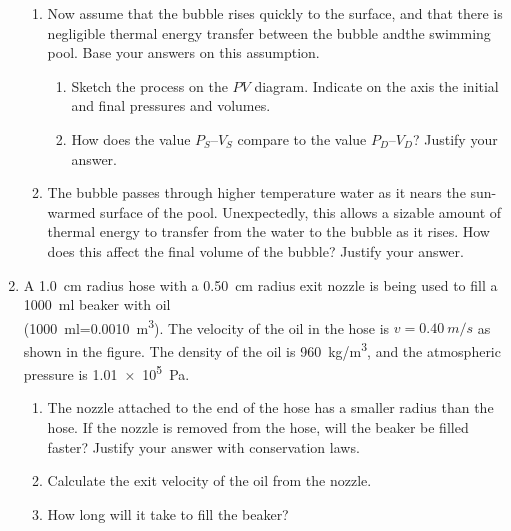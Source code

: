 \documentclass{../../../oss-apphys}
\begin{document}
\begin{enumerate}[leftmargin=15pt]
\begin{enumerate}[leftmargin=18pt]
  \item Now assume that the bubble rises quickly to the surface, and that
    there is negligible thermal energy transfer between the bubble andthe
    swimming pool. Base your answers on this assumption.
    \begin{enumerate}
    \item Sketch the process on the $PV$ diagram. Indicate on the axis the
      initial and final pressures and volumes.
    \item How does the value $P_S$--$V_S$ compare to the value $P_D$--$V_D$?
      Justify your answer.
    \end{enumerate}
    \vspace{1.75in}
    
  \item The bubble passes through higher temperature water as it nears the
    sun-warmed surface of the pool. Unexpectedly, this allows a
    sizable amount of thermal energy to transfer from the water to the
    bubble as it rises. How does this affect the final volume of the
    bubble? Justify your answer.
  \end{enumerate}
  \newpage
  
\item A \SI{1.0}{cm} radius hose with a \SI{0.50}{cm} radius exit nozzle is
  being used to fill a \SI{1000}{ml} beaker with oil\\
  (\SI{1000}{ml}=\SI{0.0010}{m^3}). The velocity of the oil in the hose is
  $v=\SI{0.40}{m/s}$ as shown in the figure. The density of the oil is
  \SI{960}{kg/m^3}, and the atmospheric pressure is \SI{1.01e5}{\pascal}.
  \begin{center}
  \end{center}
  
  \begin{enumerate}[leftmargin=18pt]
  \item The nozzle attached to the end of the hose has a smaller radius
    than the hose. If the nozzle is removed from the hose, will the
    beaker be filled faster? Justify your answer with conservation
    laws.
    \vspace{.75in}
    
  \item Calculate the exit velocity of the oil from the nozzle.
    \vspace{.75in}
    
  \item How long will it take to fill the beaker?
    \vspace{.75in}
    

\end{enumerate}
\end{enumerate}
\end{document}
